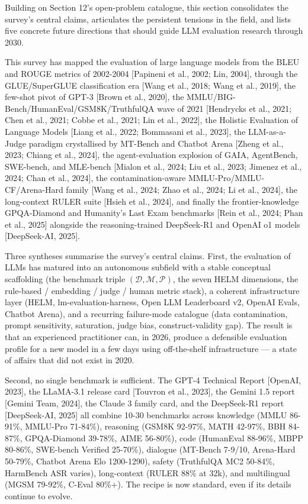 Building on Section 12's open-problem catalogue, this section consolidates the survey's central claims, articulates the persistent tensions in the field, and lists five concrete future directions that should guide LLM evaluation research through 2030.

This survey has mapped the evaluation of large language models from the BLEU and ROUGE metrics of 2002-2004 {[}Papineni et al., 2002; Lin, 2004{]}, through the GLUE/SuperGLUE classification era {[}Wang et al., 2018; Wang et al., 2019{]}, the few-shot pivot of GPT-3 {[}Brown et al., 2020{]}, the MMLU/BIG-Bench/HumanEval/GSM8K/TruthfulQA wave of 2021 {[}Hendrycks et al., 2021; Chen et al., 2021; Cobbe et al., 2021; Lin et al., 2022{]}, the Holistic Evaluation of Language Models {[}Liang et al., 2022; Bommasani et al., 2023{]}, the LLM-as-a-Judge paradigm crystallised by MT-Bench and Chatbot Arena {[}Zheng et al., 2023; Chiang et al., 2024{]}, the agent-evaluation explosion of GAIA, AgentBench, SWE-bench, and MLE-bench {[}Mialon et al., 2024; Liu et al., 2023; Jimenez et al., 2024; Chan et al., 2024{]}, the contamination-aware MMLU-Pro/MMLU-CF/Arena-Hard family {[}Wang et al., 2024; Zhao et al., 2024; Li et al., 2024{]}, the long-context RULER suite {[}Hsieh et al., 2024{]}, and finally the frontier-knowledge GPQA-Diamond and Humanity's Last Exam benchmarks {[}Rein et al., 2024; Phan et al., 2025{]} alongside the reasoning-trained DeepSeek-R1 and OpenAI o1 models {[}DeepSeek-AI, 2025{]}.

Three syntheses summarise the survey's central claims. First, the evaluation of LLMs has matured into an autonomous subfield with a stable conceptual scaffolding (the benchmark triple \((\mathcal{D}, \mathcal{M}, \mathcal{P})\), the seven HELM dimensions, the rule-based / embedding / judge / human metric stack), a coherent infrastructure layer (HELM, lm-evaluation-harness, Open LLM Leaderboard v2, OpenAI Evals, Chatbot Arena), and a recurring failure-mode catalogue (data contamination, prompt sensitivity, saturation, judge bias, construct-validity gap). The result is that an experienced practitioner can, in 2026, produce a defensible evaluation profile for a new model in a few days using off-the-shelf infrastructure --- a state of affairs that did not exist in 2020.

Second, no single benchmark is sufficient. The GPT-4 Technical Report {[}OpenAI, 2023{]}, the LLaMA-3.1 release card {[}Touvron et al., 2023{]}, the Gemini 1.5 report {[}Gemini Team, 2024{]}, the Claude 3 family card, and the DeepSeek-R1 report {[}DeepSeek-AI, 2025{]} all combine 10-30 benchmarks across knowledge (MMLU 86-91\%, MMLU-Pro 71-84\%), reasoning (GSM8K 92-97\%, MATH 42-97\%, BBH 84-87\%, GPQA-Diamond 39-78\%, AIME 56-80\%), code (HumanEval 88-96\%, MBPP 80-86\%, SWE-bench Verified 25-70\%), dialogue (MT-Bench 7-9/10, Arena-Hard 50-79\%, Chatbot Arena Elo 1200-1290), safety (TruthfulQA MC2 50-84\%, HarmBench ASR varies), long-context (RULER 88\% at 32k), and multilingual (MGSM 79-92\%, C-Eval 80\%+). The recipe is now standard, even if its details continue to evolve.

